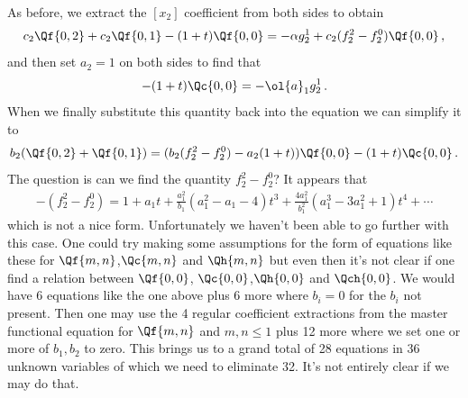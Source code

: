 As before, we extract the $[x_2]$ coefficient from both sides to obtain
\begin{align}
	 c_2\Qf{0,2}+c_2\Qf{0,1}-(1+t)\Qf{0,0} = -\alpha g_2^1 + c_2(f_2^2-f_2^0)\Qf{0,0}\,,
\end{align}
and then set $a_2 = 1$ on both sides to find that
\begin{align}
	-(1+t)\Qc{0,0} = -\ol{a}_1 g_2^1\,.
\end{align}
When we finally substitute this quantity back into the equation we can simplify it to
\begin{align}
	b_2(\Qf{0,2}+\Qf{0,1}) = (b_2(f_2^2-f_2^0)-a_2(1+t))\Qf{0,0}-(1+t)\Qc{0,0}\,.
\end{align}
The question is can we find the quantity $f_2^2-f_2^0$? It appears that
\begin{align}
	-(f_2^2-f_2^0) =1+a_1t+\frac{a_1^2}{b_1}(a_1^2-a_1-4)t^3 +\frac{4a_1^2}{b_1^2}(a_1^3-3a_1^2+1)t^4+\cdots
\end{align}
which is not a nice form. Unfortunately we haven't been able to go further with this case. One could try making some assumptions for the form of equations like these for $\Qf{m,n}$,$\Qc{m,n}$ and $\Qh{m,n}$ but even then it's not clear if one find a relation between $\Qf{0,0}$, $\Qc{0,0}$,$\Qh{0,0}$ and $\Qch{0,0}$. We would have 6 equations like the one above plus 6 more where $b_i = 0$ for the $b_i$ not present. Then one may use the 4 regular coefficient extractions from the master functional equation for $\Qf{m,n}$ and $m,n\leq 1$ plus 12 more where we set one or more of $b_1,b_2$ to zero. This brings us to a grand total of 28 equations in 36 unknown variables of which we need to eliminate 32. It's not entirely clear if we may do that.

\endinput
